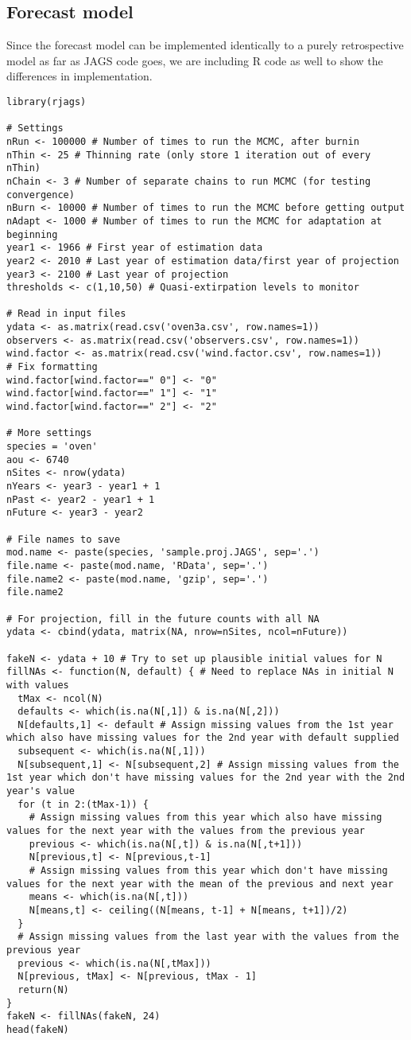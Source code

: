 \documentclass[12pt]{article}
\begin{document}
\subsection{Forecast model}
Since the forecast model can be implemented identically to a purely retrospective model
as far as JAGS code goes, we are including R code as well to show the differences in implementation.
\begin{verbatim}
library(rjags)

# Settings
nRun <- 100000 # Number of times to run the MCMC, after burnin
nThin <- 25 # Thinning rate (only store 1 iteration out of every nThin)
nChain <- 3 # Number of separate chains to run MCMC (for testing convergence)
nBurn <- 10000 # Number of times to run the MCMC before getting output
nAdapt <- 1000 # Number of times to run the MCMC for adaptation at beginning
year1 <- 1966 # First year of estimation data
year2 <- 2010 # Last year of estimation data/first year of projection
year3 <- 2100 # Last year of projection
thresholds <- c(1,10,50) # Quasi-extirpation levels to monitor

# Read in input files
ydata <- as.matrix(read.csv('oven3a.csv', row.names=1))
observers <- as.matrix(read.csv('observers.csv', row.names=1))
wind.factor <- as.matrix(read.csv('wind.factor.csv', row.names=1))
# Fix formatting
wind.factor[wind.factor==" 0"] <- "0"
wind.factor[wind.factor==" 1"] <- "1"
wind.factor[wind.factor==" 2"] <- "2"

# More settings
species = 'oven'
aou <- 6740
nSites <- nrow(ydata)
nYears <- year3 - year1 + 1
nPast <- year2 - year1 + 1
nFuture <- year3 - year2

# File names to save
mod.name <- paste(species, 'sample.proj.JAGS', sep='.')
file.name <- paste(mod.name, 'RData', sep='.')
file.name2 <- paste(mod.name, 'gzip', sep='.')
file.name2

# For projection, fill in the future counts with all NA
ydata <- cbind(ydata, matrix(NA, nrow=nSites, ncol=nFuture))

fakeN <- ydata + 10 # Try to set up plausible initial values for N
fillNAs <- function(N, default) { # Need to replace NAs in initial N with values
  tMax <- ncol(N)
  defaults <- which(is.na(N[,1]) & is.na(N[,2]))
  N[defaults,1] <- default # Assign missing values from the 1st year which also have missing values for the 2nd year with default supplied
  subsequent <- which(is.na(N[,1]))
  N[subsequent,1] <- N[subsequent,2] # Assign missing values from the 1st year which don't have missing values for the 2nd year with the 2nd year's value
  for (t in 2:(tMax-1)) {
    # Assign missing values from this year which also have missing values for the next year with the values from the previous year
    previous <- which(is.na(N[,t]) & is.na(N[,t+1]))
    N[previous,t] <- N[previous,t-1] 
    # Assign missing values from this year which don't have missing values for the next year with the mean of the previous and next year
    means <- which(is.na(N[,t]))
    N[means,t] <- ceiling((N[means, t-1] + N[means, t+1])/2)
  }
  # Assign missing values from the last year with the values from the previous year
  previous <- which(is.na(N[,tMax]))
  N[previous, tMax] <- N[previous, tMax - 1]
  return(N)
}
fakeN <- fillNAs(fakeN, 24)
head(fakeN)


\end{verbatim}
\end{document}

